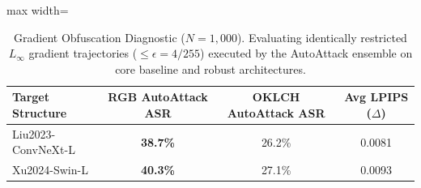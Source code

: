 \begin{table}[htbp]
\centering
\small
\caption{Gradient Obfuscation Diagnostic ($N=1{,}000$). Evaluating identically restricted $L_{\infty}$ gradient trajectories ($\leq\epsilon=4/255$) executed by the AutoAttack ensemble on core baseline and robust architectures.}
\label{tab:sota_optimizer_comparison}
\begin{adjustbox}{max width=\linewidth}%
\begin{tabular}{@{}lccc@{}}
\toprule
\textbf{Target Structure} & \textbf{RGB AutoAttack ASR} & \textbf{OKLCH AutoAttack ASR} & \textbf{Avg LPIPS ($\Delta$)} \\ \midrule
Liu2023-ConvNeXt-L & \textbf{38.7\%} & 26.2\% & 0.0081 \\
Xu2024-Swin-L & \textbf{40.3\%} & 27.1\% & 0.0093 \\
\bottomrule
\end{tabular}
\end{adjustbox}
\end{table}
